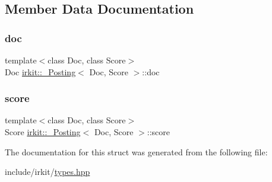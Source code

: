 \subsection{Member Data Documentation}
\mbox{\label{structirkit_1_1__Posting_a6ee624b39c69f2b8701701ecc8fe6a0b}} 
\subsubsection{\texorpdfstring{doc}{doc}}
{\footnotesize\ttfamily template$<$class Doc, class Score$>$ \\
Doc \hyperlink{structirkit_1_1__Posting}{irkit\+::\+\_\+\+Posting}$<$ Doc, Score $>$\+::doc}

\mbox{\label{structirkit_1_1__Posting_a3c5cc3b179d8fb975d3356847e34955f}} 
\subsubsection{\texorpdfstring{score}{score}}
{\footnotesize\ttfamily template$<$class Doc, class Score$>$ \\
Score \hyperlink{structirkit_1_1__Posting}{irkit\+::\+\_\+\+Posting}$<$ Doc, Score $>$\+::score}



The documentation for this struct was generated from the following file\+:\begin{DoxyCompactItemize}
\item 
include/irkit/\hyperlink{types_8hpp}{types.\+hpp}\end{DoxyCompactItemize}
